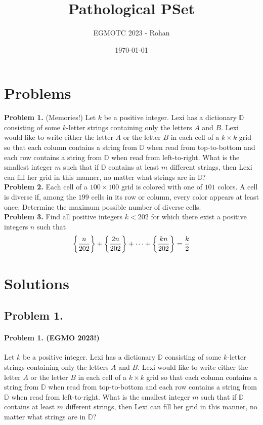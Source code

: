 \documentclass[12pt]{article}
\title{Pathological PSet}
\author{EGMOTC 2023 - Rohan}
\date{\today}
\begin{document}
\maketitle

\newcommand{\localtextbulletone}{\textcolor{black}{\raisebox{.45ex}{\rule{.6ex}{.6ex}}}}
\renewcommand{\labelitemi}{\localtextbulletone}

\section*{Problems}
\vspace{1cm}
\thispagestyle{empty}

\textbf{Problem 1.} (Memories!) Let $k$ be a positive integer. Lexi has a dictionary $\mathbb{D}$ consisting of some $k$-letter strings containing only the letters $A$ and $B$. Lexi would like to write either the letter $A$ or the letter $B$ in each cell of a $k \times k$ grid so that each column contains a string from $\mathbb{D}$ when read from top-to-bottom and each row contains a string from $\mathbb{D}$ when read from left-to-right.
What is the smallest integer $m$ such that if $\mathbb{D}$ contains at least $m$ different strings, then Lexi can fill her grid in this manner, no matter what strings are in $\mathbb{D}$?\\

\textbf{Problem 2.} Each cell of a $100\times 100$ grid is colored with one of $101$ colors. A cell is diverse if, among the $199$ cells in its row or column, every color appears at least once. Determine the maximum possible number of diverse cells.\\

\textbf{Problem 3.} Find all positive integers $k<202$ for which there exist a positive integers $n$ such that
\[\bigg {\{}\frac{n}{202}\bigg {\}}+\bigg {\{}\frac{2n}{202}\bigg {\}}+\cdots +\bigg {\{}\frac{kn}{202}\bigg {\}}=\frac{k}{2}\]

\eject

\section*{Solutions}

\subsection*{Problem 1.}

\paragraph*{\textbf{Problem 1. (EGMO 2023!)}} Let $k$ be a positive integer. Lexi has a dictionary $\mathbb{D}$ consisting of some $k$-letter strings containing only the letters $A$ and $B$. Lexi would like to write either the letter $A$ or the letter $B$ in each cell of a $k \times k$ grid so that each column contains a string from $\mathbb{D}$ when read from top-to-bottom and each row contains a string from $\mathbb{D}$ when read from left-to-right.
What is the smallest integer $m$ such that if $\mathbb{D}$ contains at least $m$ different strings, then Lexi can fill her grid in this manner, no matter what strings are in $\mathbb{D}$?\\
\end{document}
